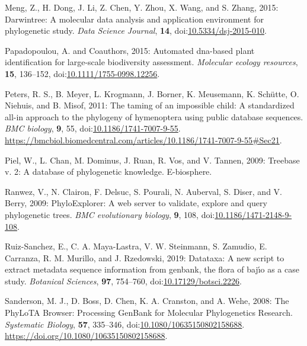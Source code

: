 \documentclass[draft]{ametsoc}
\begin{document}
\leavevmode\hypertarget{ref-meng2015darwintree}{}%
Meng, Z., H. Dong, J. Li, Z. Chen, Y. Zhou, X. Wang, and S. Zhang, 2015:
Darwintree: A molecular data analysis and application environment for
phylogenetic study. \emph{Data Science Journal}, \textbf{14},
doi:\href{https://doi.org/10.5334/dsj-2015-010}{10.5334/dsj-2015-010}.

\leavevmode\hypertarget{ref-papadopoulou2015automated}{}%
Papadopoulou, A. and Coauthors, 2015: Automated dna-based plant
identification for large-scale biodiversity assessment. \emph{Molecular
ecology resources}, \textbf{15}, 136--152,
doi:\href{https://doi.org/10.1111/1755-0998.12256}{10.1111/1755-0998.12256}.

\leavevmode\hypertarget{ref-peters2011taming}{}%
Peters, R. S., B. Meyer, L. Krogmann, J. Borner, K. Meusemann, K.
Schütte, O. Niehuis, and B. Misof, 2011: The taming of an impossible
child: A standardized all-in approach to the phylogeny of hymenoptera
using public database sequences. \emph{BMC biology}, \textbf{9}, 55,
doi:\href{https://doi.org/10.1186/1741-7007-9-55}{10.1186/1741-7007-9-55}.
\url{https://bmcbiol.biomedcentral.com/articles/10.1186/1741-7007-9-55\#Sec21}.

\leavevmode\hypertarget{ref-piel2009treebase}{}%
Piel, W., L. Chan, M. Dominus, J. Ruan, R. Vos, and V. Tannen, 2009:
Treebase v. 2: A database of phylogenetic knowledge. E-biosphere.

\leavevmode\hypertarget{ref-ranwez2009phyloexplorer}{}%
Ranwez, V., N. Clairon, F. Delsuc, S. Pourali, N. Auberval, S. Diser,
and V. Berry, 2009: PhyloExplorer: A web server to validate, explore and
query phylogenetic trees. \emph{BMC evolutionary biology}, \textbf{9},
108,
doi:\href{https://doi.org/10.1186/1471-2148-9-108}{10.1186/1471-2148-9-108}.

\leavevmode\hypertarget{ref-ruiz2019datataxa}{}%
Ruiz-Sanchez, E., C. A. Maya-Lastra, V. W. Steinmann, S. Zamudio, E.
Carranza, R. M. Murillo, and J. Rzedowski, 2019: Datataxa: A new script
to extract metadata sequence information from genbank, the flora of
bajı́o as a case study. \emph{Botanical Sciences}, \textbf{97}, 754--760,
doi:\href{https://doi.org/10.17129/botsci.2226}{10.17129/botsci.2226}.

\leavevmode\hypertarget{ref-sanderson2008phylota}{}%
Sanderson, M. J., D. Boss, D. Chen, K. A. Cranston, and A. Wehe, 2008:
The PhyLoTA Browser: Processing GenBank for Molecular Phylogenetics
Research. \emph{Systematic Biology}, \textbf{57}, 335--346,
doi:\href{https://doi.org/10.1080/10635150802158688}{10.1080/10635150802158688}.
\url{https://doi.org/10.1080/10635150802158688}.
\end{document}
